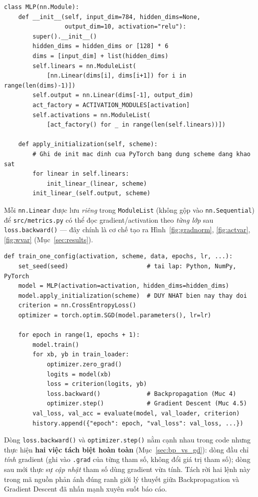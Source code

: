 \documentclass[12pt,a4paper]{article}
\begin{document}
\begin{lstlisting}[caption={Định nghĩa MLP và khởi tạo lại theo scheme (trích từ src/models.py)}]
class MLP(nn.Module):
    def __init__(self, input_dim=784, hidden_dims=None,
                 output_dim=10, activation="relu"):
        super().__init__()
        hidden_dims = hidden_dims or [128] * 6
        dims = [input_dim] + list(hidden_dims)
        self.linears = nn.ModuleList(
            [nn.Linear(dims[i], dims[i+1]) for i in range(len(dims)-1)])
        self.output = nn.Linear(dims[-1], output_dim)
        act_factory = ACTIVATION_MODULES[activation]
        self.activations = nn.ModuleList(
            [act_factory() for _ in range(len(self.linears))])

    def apply_initialization(self, scheme):
        # Ghi de init mac dinh cua PyTorch bang dung scheme dang khao sat
        for linear in self.linears:
            init_linear_(linear, scheme)
        init_linear_(self.output, scheme)
\end{lstlisting}

Mỗi \texttt{nn.Linear} được lưu \emph{riêng} trong \texttt{ModuleList}
(không gộp vào \texttt{nn.Sequential}) để \texttt{src/metrics.py} có thể
đọc gradient/activation theo \emph{từng lớp} sau \texttt{loss.backward()}
--- đây chính là cơ chế tạo ra Hình~\ref{fig:gradnorm}, \ref{fig:actvar},
\ref{fig:wvar} (Mục~\ref{sec:results}).

\begin{lstlisting}[caption={Vòng lặp huấn luyện, rút gọn (trích từ src/training.py)}]
def train_one_config(activation, scheme, data, epochs, lr, ...):
    set_seed(seed)                      # tai lap: Python, NumPy, PyTorch
    model = MLP(activation=activation, hidden_dims=hidden_dims)
    model.apply_initialization(scheme)  # DUY NHAT bien nay thay doi
    criterion = nn.CrossEntropyLoss()
    optimizer = torch.optim.SGD(model.parameters(), lr=lr)

    for epoch in range(1, epochs + 1):
        model.train()
        for xb, yb in train_loader:
            optimizer.zero_grad()
            logits = model(xb)
            loss = criterion(logits, yb)
            loss.backward()             # Backpropagation (Muc 4)
            optimizer.step()            # Gradient Descent (Muc 4.5)
        val_loss, val_acc = evaluate(model, val_loader, criterion)
        history.append({"epoch": epoch, "val_loss": val_loss, ...})
\end{lstlisting}

Dòng \texttt{loss.backward()} và \texttt{optimizer.step()} nằm cạnh nhau
trong code nhưng thực hiện \textbf{hai việc tách biệt hoàn toàn}
(Mục~\ref{sec:bp_vs_gd}): dòng đầu chỉ \emph{tính} gradient (ghi vào
\texttt{.grad} của từng tham số, không đổi giá trị tham số); dòng sau mới
thực sự \emph{cập nhật} tham số dùng gradient vừa tính. Tách rời hai lệnh
này trong mã nguồn phản ánh đúng ranh giới lý thuyết giữa Backpropagation
và Gradient Descent đã nhấn mạnh xuyên suốt báo cáo.
\end{document}
